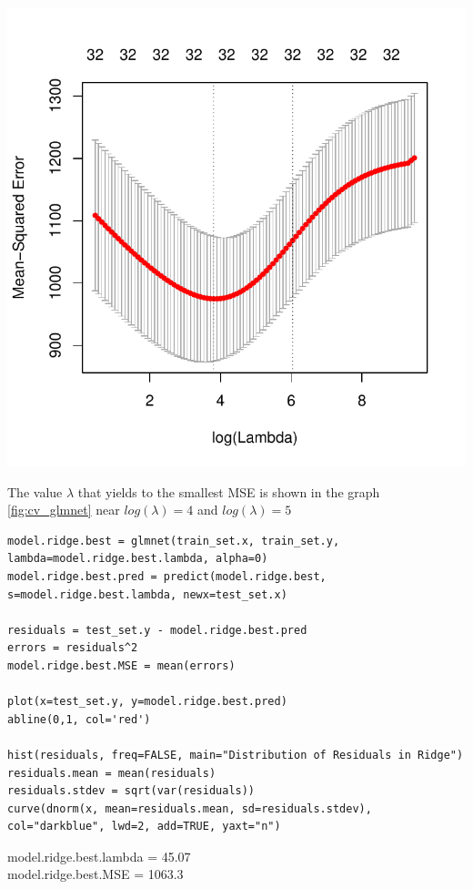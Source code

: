 \documentclass[]{report}
\begin{document}
\begin{center}
	\includegraphics[width=0.8\linewidth]{Figures/cv_glmnet.pdf}
	\label{fig:cv_glmnet}
\end{center}

The value $\lambda$ that yields to the smallest MSE is shown in the graph \ref{fig:cv_glmnet} near $log(\lambda)=4$ and $log(\lambda)=5 $


\begin{lstlisting}
model.ridge.best = glmnet(train_set.x, train_set.y, lambda=model.ridge.best.lambda, alpha=0)
model.ridge.best.pred = predict(model.ridge.best, s=model.ridge.best.lambda, newx=test_set.x)

residuals = test_set.y - model.ridge.best.pred
errors = residuals^2
model.ridge.best.MSE = mean(errors)

plot(x=test_set.y, y=model.ridge.best.pred)
abline(0,1, col='red')

hist(residuals, freq=FALSE, main="Distribution of Residuals in Ridge")
residuals.mean = mean(residuals)
residuals.stdev = sqrt(var(residuals))
curve(dnorm(x, mean=residuals.mean, sd=residuals.stdev), col="darkblue", lwd=2, add=TRUE, yaxt="n")
\end{lstlisting}

\begin{center} 
	model.ridge.best.lambda = 45.07 \\
	model.ridge.best.MSE = 1063.3
\end{center} 
\end{document}

